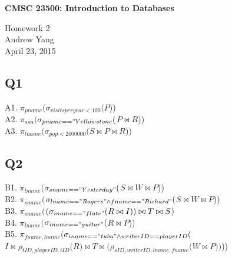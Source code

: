 \documentclass{article}[12pt]
\newcommand{\assignment}{Homework 2}
\newcommand{\whoami}{Andrew Yang}
\newcommand{\assignmentdate}{April 23, 2015}
\newcommand{\rel}[1]{\ensuremath{#1}}
\newcommand{\conj}[2]{\ensuremath{#1 \wedge #2}}
\newcommand{\nj}[2]{\ensuremath{#1 \bowtie #2}}
\newcommand{\sel}[2]{\ensuremath{\sigma_{#1} #2}}
\newcommand{\proj}[2]{\ensuremath{\pi_{#1} #2}}
\newcommand{\ren}[2]{\ensuremath{\rho_{#1} #2}}
\begin{document}
{\large \bf CMSC 23500: Introduction to Databases}

\assignment \\
\whoami \\
\assignmentdate

\hrulefill


\subsection*{Q1}
A1. \proj {pname} (\sel {visits per year < 100}(\rel{P}))\\
A2. \proj {ssn} (\sel {pname == "Yellowstone} (\nj{\rel{P}}{\rel{R}}))\\
A3. \proj {lname} (\sel {pop < 2000000} (\nj {\nj {\rel{S}}{\rel{P}}} {\rel{R}}))

\subsection*{Q2}
B1. \proj {lname} (\sel {sname == "Yesterday"}(\nj{\nj{\rel{S}}{\rel{W}}}{\rel{P}}))\\
B2. \proj {sname} ({\sel {\conj {lname == "Rogers"} {fname == "Richard"}}(\nj{\nj{\rel{S}}{\rel{W}}}{\rel{P}}))\\
B3. \proj {sname} (\nj{ \nj {(\sel{iname == "flute"}(\nj{\rel{R}}{\rel{I}}))}{\rel{T}}} {\rel{S}}) \\
B4. \proj {lname} (\sel{iname == "guitar"}(\nj{\rel{R}}{\rel{P}}))\\
B5. \proj {fname, lname}(\sel {\conj {iname == "tuba" }  {writerID == playerID}} (\nj{\nj{\rel{I}}{\ren{tID, playerID, iID} ({\rel{R})}} } {\nj{\rel{T}}(\ren{sID, writerID, lname, fname}(\nj{\rel{W}}{\rel{P}}))}}))






\end{document}
